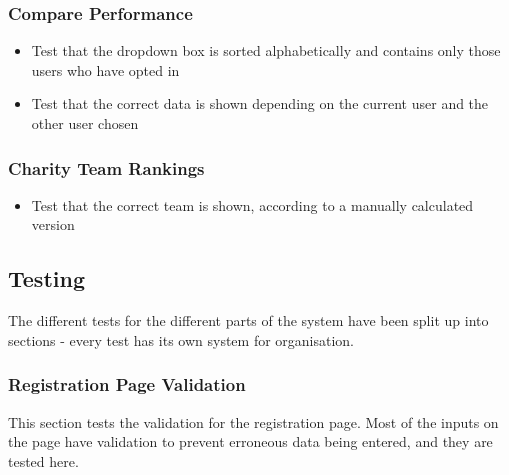 \documentclass{article}[12pt,a4paper]
\begin{document}
\subsubsection{Compare Performance}
\begin{itemize}
  \item Test that the dropdown box is sorted alphabetically and contains only those users who have opted in
  \item Test that the correct data is shown depending on the current user and the other user chosen
\end{itemize}

\subsubsection{Charity Team Rankings}
\begin{itemize}
  \item Test that the correct team is shown, according to a manually calculated version
\end{itemize}

\subsection{Testing}
The different tests for the different parts of the system have been split up into sections - every test has its own system for organisation.

\subsubsection{Registration Page Validation}
This section tests the validation for the registration page. Most of the inputs on the page have validation to prevent erroneous data being entered, and they are tested here.
\end{document}
